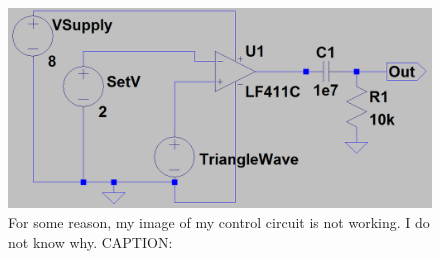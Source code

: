 
\begin{figure}[h]
	\centering
	\includegraphics[width=\textwidth]{PWM}
	\caption{For some reason, my image of my control circuit is not working. I do not know why. CAPTION: }
	\label{fig:ctrl}
\end{figure}

